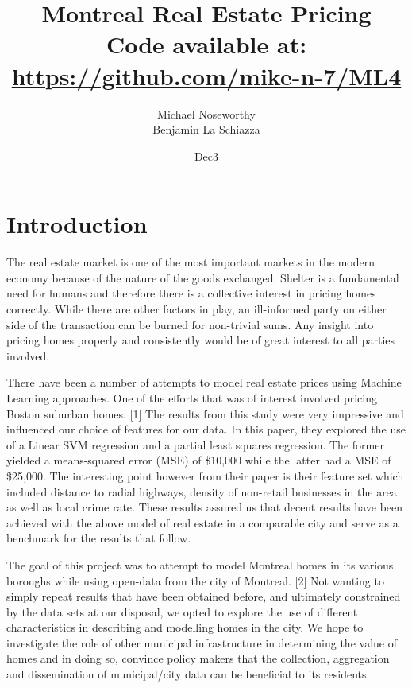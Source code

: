 \documentclass{acm_proc_article-sp}
\begin{document}
\title{Montreal Real Estate Pricing \\
{\normalsize Code available at: \url{https://github.com/mike-n-7/ML4}}} 
\subtitle{}

\author{
\alignauthor 
Michael Noseworthy \\
\alignauthor Benjamin La Schiazza\\
}

\date{Dec3}

\maketitle
\begin{abstract}

\end{abstract}

\section{Introduction}

	The real estate market is one of the most important markets in the modern economy because of the nature of the goods exchanged. Shelter is a fundamental need for humans and therefore there is a collective interest in pricing homes correctly. While there are other factors in play, an ill-informed party on either side of the transaction can be burned for non-trivial sums. Any insight into pricing homes properly and consistently would be of great interest to all parties involved. 
	
	There have been a number of attempts to model real estate prices using Machine Learning approaches. One of the efforts that was of interest involved pricing Boston suburban homes. [1] The results from this study were very impressive and influenced our choice of features for our data. In this paper, they explored the use of a Linear SVM regression and a partial least squares regression. The former yielded a means-squared error (MSE) of \$10,000 while the latter had a MSE of \$25,000. The interesting point however from their paper is their feature set which included distance to radial highways, density of non-retail businesses in the area as well as local crime rate. These results assured us that decent results have been achieved with the above model of real estate in a comparable city and serve as a benchmark for the results that follow. 
	
	The goal of this project was to attempt to model Montreal homes in its various boroughs while using open-data from the city of Montreal. [2] Not wanting to simply repeat results that have been obtained before, and ultimately constrained by the data sets at our disposal, we opted to explore the use of different characteristics in describing and modelling homes in the city. We hope to investigate the role of other municipal infrastructure in determining the value of homes and in doing so, convince policy makers that the collection, aggregation and dissemination of municipal/city data can be beneficial to its residents.
\end{document}
